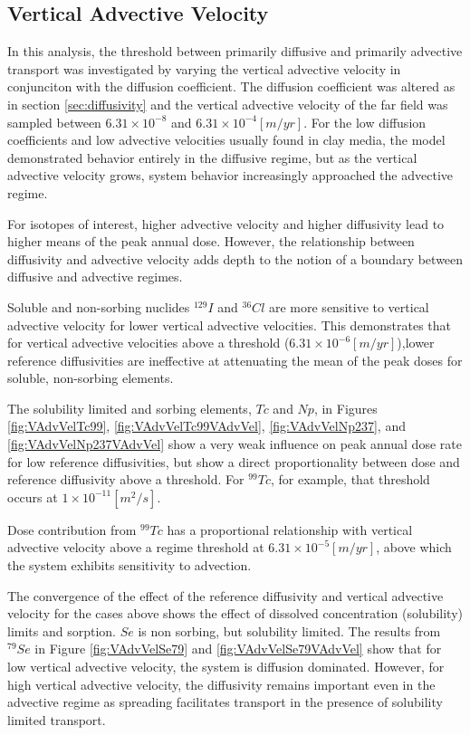 \subsection{Vertical Advective Velocity}

In this analysis, the threshold between primarily diffusive and primarily 
advective transport was investigated by varying the vertical advective velocity 
in conjunciton with the diffusion coefficient.  The diffusion coefficient was 
altered as in section \ref{sec:diffusivity} and the vertical advective velocity 
of the far field was sampled between $ 6.31\times 10^{-8}$ and $ 
6.31\times10^{-4} [m/yr]$.  For the low diffusion coefficients and low advective 
velocities usually found in clay media, the model demonstrated behavior entirely 
in the diffusive regime, but as the vertical advective velocity grows, system 
behavior increasingly approached the advective regime. 

For isotopes of interest, higher advective velocity and higher diffusivity lead to higher 
means of the peak annual dose. However, the relationship between diffusivity and 
advective velocity adds depth to the notion of a boundary between diffusive and 
advective regimes.

Soluble and non-sorbing nuclides $^{129}I$ and 
$^{36}Cl$ are more sensitive to vertical advective velocity for lower vertical 
advective velocities. This demonstrates that for vertical advective velocities 
above a threshold ($6.31\times10^{-6}[m/yr]$),lower reference diffusivities are 
ineffective at attenuating the mean of the peak doses for soluble, non-sorbing 
elements. 

The solubility limited and sorbing elements, $Tc$ and $Np$, in Figures 
\ref{fig:VAdvVelTc99}, \ref{fig:VAdvVelTc99VAdvVel}, \ref{fig:VAdvVelNp237}, and 
\ref{fig:VAdvVelNp237VAdvVel} show a very weak influence on peak annual dose 
rate for low reference diffusivities, but show a direct proportionality between 
dose and reference diffusivity above a threshold. For $^{99}Tc$, for example, 
that threshold occurs at $1\times10^{-11}[m^2/s]$. 

Dose contribution from $^{99}Tc$ has a proportional 
relationship with vertical advective velocity above a regime threshold at 
$6.31\times10^{-5}[m/yr]$, above which the system exhibits sensitivity to 
advection. 

The convergence of the effect of the reference diffusivity and vertical 
advective velocity for the cases above shows the effect of dissolved 
concentration (solubility) limits and sorption. $Se$ is non sorbing, but 
solubility limited.  The results from $^{79}Se$ in Figure \ref{fig:VAdvVelSe79} 
and \ref{fig:VAdvVelSe79VAdvVel} show that for low vertical advective velocity, 
the system is diffusion dominated.  However, for high vertical advective 
velocity, the diffusivity remains important even in the advective regime as 
spreading facilitates transport in the presence of solubility limited transport. 
